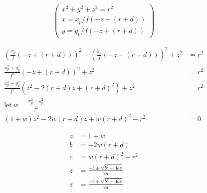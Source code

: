 \documentclass{article}
\begin{document}
\[ %
\begin{pmatrix}
x^2 + y^2 + z^2 = r^2 \\
x = x_p / f (-z + (r + d)) \\
y = y_p / f (-z + (r + d))
\end{pmatrix}
\]

\[ %
\begin{aligned}
\left(\frac{x_p}{f} (-z + (r + d)) \right)^2 +
  \left(\frac{y_p}{f} (-z + (r + d)) \right)^2 + z^2 &= r^2 \\
\frac{x_p^2 + y_p^2}{f^2} (-z + (r + d))^2 + z^2 &= r^2 \\
\frac{x_p^2 + y_p^2}{f^2} (z^2 - 2(r + d)z + (r + d)^2) + z^2 &= r^2 \\
\text{let} \ w = \frac{x_p^2 + y_p^2}{f^2} \\
(1 + w) z^2 - 2w(r + d)z + w(r + d)^2 - r^2 &= 0
\end{aligned}
\]

\[ %
\begin{aligned}
a &= 1 + w \\
b &= -2w(r + d) \\
c &= w(r + d)^2 - r^2 \\
z &= \frac{-b \pm \sqrt{b^2 - 4ac}}{2a} \\
z &= \frac{-b + \sqrt{b^2 - 4ac}}{2a}
\end{aligned}
\]
\end{document}
